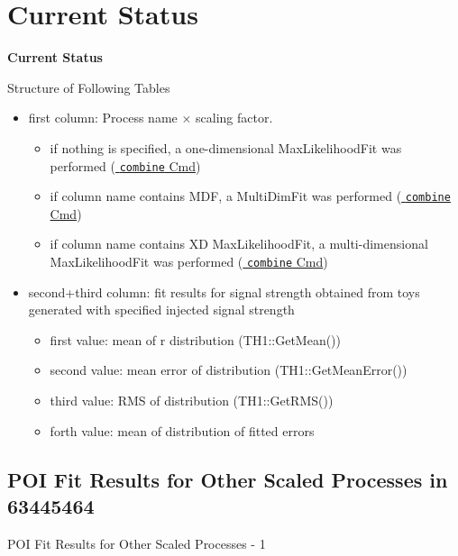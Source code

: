 \section{Current Status}
\begin{frame}
\centering
\textbf{\Huge{Current Status}}
\end{frame}

\begin{frame}{Structure of Following Tables}
\begin{itemize}
\item first column: Process name $\times$ scaling factor.
\begin{itemize}
\item if nothing is specified, a one-dimensional MaxLikelihoodFit was performed (\hyperlink{1DML}{\color{blue} \texttt{combine} Cmd})
\item if column name contains MDF, a MultiDimFit was performed (\hyperlink{MDF}{\color{blue} \texttt{combine} Cmd})
\item if column name contains XD MaxLikelihoodFit, a multi-dimensional MaxLikelihoodFit was performed (\hyperlink{MDML}{\color{blue} \texttt{combine} Cmd})
\end{itemize}
\item second+third column: fit results for signal strength obtained from toys generated with specified injected signal strength
\begin{itemize}
\item first value: mean of r distribution (TH1::GetMean())
\item second value: mean error of distribution (TH1::GetMeanError())
\item third value: RMS of distribution (TH1::GetRMS())
\item forth value: mean of distribution of fitted errors
\end{itemize}
\end{itemize}
\end{frame}

\subsection{POI Fit Results for Other Scaled Processes in 63445464}

\begin{frame}{POI Fit Results for Other Scaled Processes - 1}
\begin{scriptsize}

\end{scriptsize}

\end{frame}


